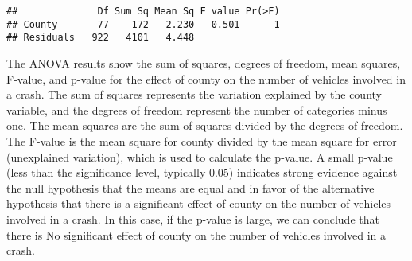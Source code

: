 \documentclass[
]{article}
\begin{document}
\begin{verbatim}
##              Df Sum Sq Mean Sq F value Pr(>F)
## County       77    172   2.230   0.501      1
## Residuals   922   4101   4.448
\end{verbatim}

The ANOVA results show the sum of squares, degrees of freedom, mean
squares, F-value, and p-value for the effect of county on the number of
vehicles involved in a crash. The sum of squares represents the
variation explained by the county variable, and the degrees of freedom
represent the number of categories minus one. The mean squares are the
sum of squares divided by the degrees of freedom. The F-value is the
mean square for county divided by the mean square for error (unexplained
variation), which is used to calculate the p-value. A small p-value
(less than the significance level, typically 0.05) indicates strong
evidence against the null hypothesis that the means are equal and in
favor of the alternative hypothesis that there is a significant effect
of county on the number of vehicles involved in a crash. In this case,
if the p-value is large, we can conclude that there is No significant
effect of county on the number of vehicles involved in a crash.
\end{document}
